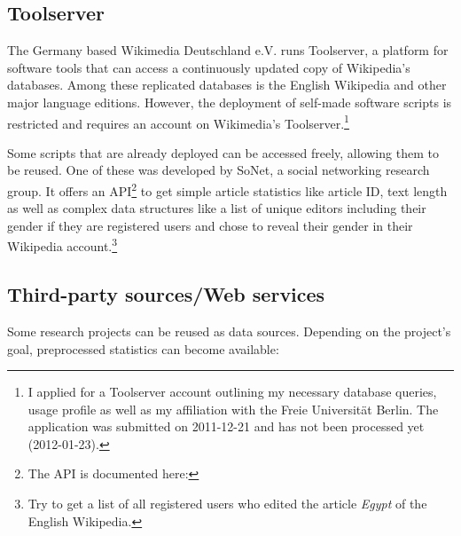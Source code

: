 \subsection{Toolserver}\label{sub:toolserver}

The Germany based Wikimedia Deutschland e.V. runs Toolserver, a platform for software tools that can access a continuously updated copy of Wikipedia's databases. 
Among these replicated databases is the English Wikipedia and other major language editions.
However, the deployment of self-made software scripts is restricted and requires an account on Wikimedia's Toolserver.\footnote{I applied for a Toolserver account outlining my necessary database queries, usage profile as well as my affiliation with the Freie Universit\"at Berlin. The application was submitted on 2011-12-21 and has not been processed yet (2012-01-23).}

Some scripts that are already deployed can be accessed freely, allowing them to be reused.
One of these was developed by SoNet, a social networking research group.
It offers an API\footnote{The API is documented here: } to get simple article statistics like article ID, text length as well as complex data structures like a list of unique editors including their gender if they are registered users and chose to reveal their gender in their Wikipedia account.\footnote{Try  to get a list of all registered users who edited the article \emph{Egypt} of the English Wikipedia.}


\subsection{Third-party sources/Web services}

Some research projects can be reused as data sources.
Depending on the project's goal, preprocessed statistics can become available:

